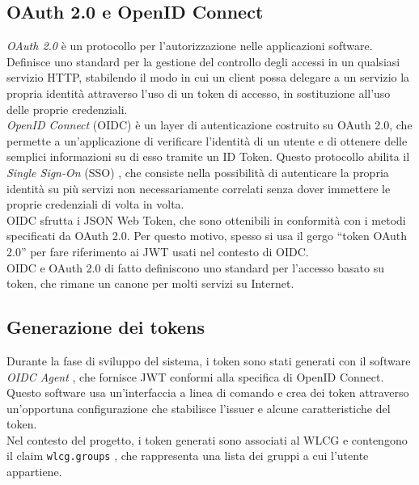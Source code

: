 \subsection{OAuth 2.0 e OpenID Connect}
\textit{OAuth 2.0} \cite{oauth_rfc} è un protocollo per l'autorizzazione nelle applicazioni software. Definisce uno standard per la gestione del controllo degli accessi
in un qualsiasi servizio HTTP, stabilendo il modo in cui un client possa delegare a un servizio la propria identità attraverso l'uso di un token di accesso, in sostituzione all'uso delle proprie credenziali. 
\\ \textit{OpenID Connect} (OIDC) \cite{oidc_doc} è un layer di autenticazione costruito su OAuth 2.0, che permette a un'applicazione di 
verificare l'identità di un utente e di ottenere delle semplici informazioni su di esso tramite un ID Token. Questo protocollo abilita il \textit{Single Sign-On} (SSO) \cite{sso_doc}, 
che consiste nella possibilità di autenticare la propria identità su più servizi non necessariamente correlati senza dover immettere le proprie credenziali di volta in volta. 
\\OIDC sfrutta i JSON Web Token, che sono ottenibili in conformità con i metodi specificati da OAuth 2.0. Per questo motivo, spesso si usa il gergo
``token OAuth 2.0'' per fare riferimento ai JWT usati nel contesto di OIDC.  
\\OIDC e OAuth 2.0 di fatto definiscono uno standard per l'accesso basato su token, che rimane un canone per molti servizi su Internet.

\subsection{Generazione dei tokens}
Durante la fase di sviluppo del sistema, i token sono stati generati con il software \textit{OIDC Agent} \cite{oidc_agent}, che fornisce JWT conformi alla specifica di OpenID Connect.
Questo software usa un'interfaccia a linea di comando e crea dei token attraverso un'opportuna configurazione che stabilisce l'issuer e alcune caratteristiche del token.
\\ Nel contesto del progetto, i token generati sono associati al WLCG e contengono il claim \texttt{wlcg.groups} \cite{wlcg_jwt}, che rappresenta una lista dei gruppi a cui l'utente appartiene. 

